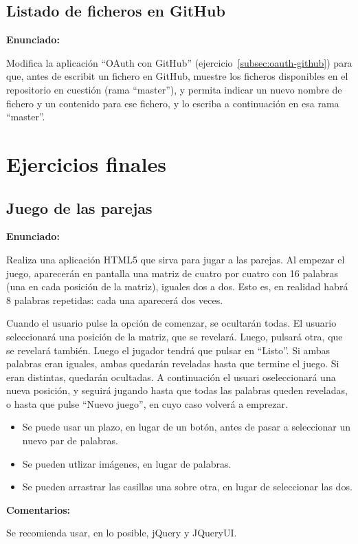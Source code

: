 \subsection{Listado de ficheros en GitHub}
\label{subsec:oauth-github-ficheros}

\textbf{Enunciado:}

Modifica la aplicación ``OAuth con GitHub'' (ejercicio~\ref{subsec:oauth-github}) para que, antes de escribit un fichero en GitHub, muestre los ficheros disponibles en el repositorio en cuestión (rama ``master''), y permita indicar un nuevo nombre de fichero y un contenido para ese fichero, y lo escriba a continuación en esa rama ``master''.

\section{Ejercicios finales}

\subsection{Juego de las parejas}
\label{subsec:finales-parejas}

\textbf{Enunciado:}

Realiza una aplicación HTML5 que sirva para jugar a las parejas. Al empezar el juego, aparecerán en pantalla una matriz de cuatro por cuatro con 16 palabras (una en cada posición de la matriz), iguales dos a dos. Esto es, en realidad habrá 8 palabras repetidas: cada una aparecerá dos veces.

Cuando el usuario pulse la opción de comenzar, se ocultarán todas. El usuario seleccionará una posición de la matriz, que se revelará. Luego, pulsará otra, que se revelará también. Luego el jugador tendrá que pulsar en ``Listo''. Si ambas palabras eran iguales, ambas quedarán reveladas hasta que termine el juego. Si eran distintas, quedarán ocultadas. A continuación el usuari oseleccionará una nueva posición, y seguirá jugando hasta que todas las palabras queden reveladas, o hasta que pulse ``Nuevo juego'', en cuyo caso volverá a emprezar.

\begin{itemize}
\item Se puede usar un plazo, en lugar de un botón, antes de pasar a seleccionar un nuevo par de palabras.
\item Se pueden utlizar imágenes, en lugar de palabras.
\item Se pueden arrastrar las casillas una sobre otra, en lugar de seleccionar las dos.
\end{itemize}


\textbf{Comentarios:}

Se recomienda usar, en lo posible, jQuery y JQueryUI.


